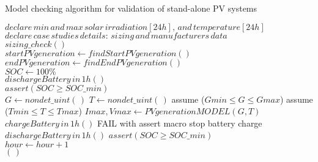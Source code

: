  \begin{algorithm}
 \caption{Model checking algorithm for validation of stand-alone PV systems}
 \begin{algorithmic}[1]
 \begin{scriptsize}
 \renewcommand{\algorithmicrequire}{\textbf{Input:}}
 \renewcommand{\algorithmicensure}{\textbf{Output:}}
  \STATE $declare \, min \, and \, max \, solar \, irradiation[24h], \, and \, temperature[24h]$\\
  \STATE $declare \, case \, studies \, details: \, sizing \, and \, manufacturers \, data $ \\
  \STATE $sizing \_ check()$ \\
  \STATE $startPVgeneration \leftarrow findStartPVgeneration()$ \\
  \STATE $endPVgeneration \leftarrow findEndPVgeneration()$ \\
  \STATE $SOC \leftarrow 100\%$ \\
	  \STATE $dischargeBattery \, in \, 1h()$ \\
	  \STATE $assert (SOC \geq SOC \_ min)$ \\
  \ENDFOR
    \STATE $G \leftarrow nondet \_ uint(\,)$ 
    \STATE $T \leftarrow nondet \_ uint(\,)$ 
    \STATE assume ($Gmin \leq G \leq Gmax$) 
    \STATE assume ($Tmin \leq T \leq Tmax$) 
    \STATE $Imax, Vmax \leftarrow PVgenerationMODEL (G,T)$ \\
      \STATE $chargeBattery \, in \, 1h()$ 
      \STATE FAIL with assert macro 
      \STATE stop battery charge 
      \STATE $dischargeBattery \, in \, 1h()$ 
    \ENDIF
    \STATE $assert (SOC \geq SOC \_ min)$ \\
    \STATE $hour \leftarrow hour+1$ \\
   \ENDFOR
  \ENDFOR
 \RETURN $(\,)$ 
  \end{scriptsize}
 \end{algorithmic} 
 \label{alg:verification-algorithm}
 \end{algorithm}

